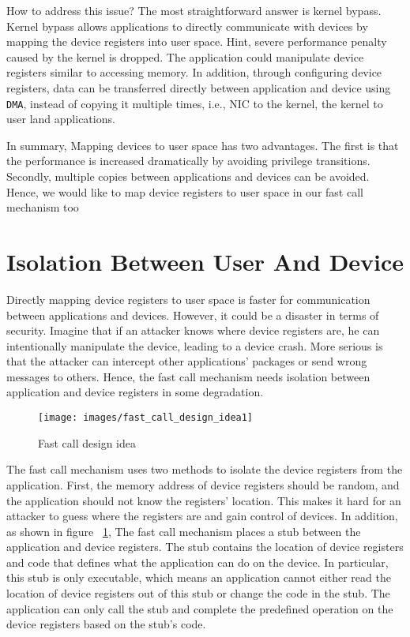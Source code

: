 How to address this issue? The most straightforward 
answer is kernel bypass. Kernel bypass allows applications to directly 
communicate with devices by mapping the device registers into user space. 
Hint, severe performance penalty caused by the kernel is dropped. 
The application could manipulate device registers similar to accessing memory. 
In addition, through configuring device registers, data can be 
transferred directly between application and device using \verb|DMA|, 
instead of copying it multiple times, i.e., NIC to the kernel, 
the kernel to user land applications.

In summary, Mapping devices to user space has two advantages. 
The first is that the performance is increased dramatically 
by avoiding privilege transitions. Secondly, multiple copies 
between applications and devices can be avoided. 
Hence, we would like to map device registers to user space 
in our fast call mechanism too

\section{Isolation Between User And Device}



Directly mapping device registers to user space 
is faster for communication between applications 
and devices. However, it could be a disaster in terms 
of security. Imagine that if an attacker knows where device
 registers are, he can intentionally manipulate the device, 
 leading to a device crash. More serious is that the attacker 
 can intercept other applications' packages or send wrong messages to others.  
Hence, the fast call mechanism needs isolation between application 
and device registers in some degradation. 

\begin{figure}[tbp]
  \centering
  \texttt{[image: images/fast\_call\_design\_idea1]}
  \caption[Short description]{Fast call design idea}
  \label{fig:fast_call_design_idea1}
\end{figure}

The fast call mechanism uses two methods to isolate the 
device registers from the application. First,  the memory 
address of device registers should be random, and the 
application should not know the registers' location. 
This makes it hard for an attacker to guess where the 
registers are and gain control of devices.  In addition, 
as shown in figure ~\ref{fig:fast_call_design_idea1}, The 
fast call mechanism places a stub between the application 
and device registers. The stub contains the location of device 
registers and code that defines what the application can do on 
the device. In particular, this stub is only executable, which 
means an application cannot either read the location of device 
registers out of this stub or change the code in the stub. 
The application can only call the stub and complete the predefined 
operation on the device registers based on the stub's code. 	 


